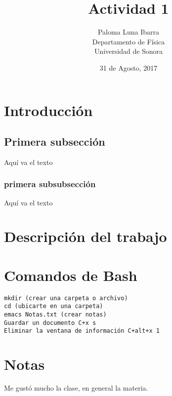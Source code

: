 \documentclass{article}
\title {Actividad 1}
\author {Paloma Luna Ibarra\\Departamento de Física\\ Universidad de Sonora}
\date {31 de Agosto, 2017}
\begin{document}
\maketitle
\section{Introducción}

\subsection{Primera subsección}
Aquí va el texto

\subsubsection{primera subsubsección}
Aquí va el texto

\section{Descripción del trabajo}

\section{Comandos de Bash}
\begin{verbatim}
mkdir (crear una carpeta o archivo)
cd (ubicarte en una carpeta)
emacs Notas.txt (crear notas)
Guardar un documento C+x s
Eliminar la ventana de información C+alt+x 1
\end{verbatim}
\section{Notas}
\begin{minipage}{2in}
Me gustó mucho la clase, en general la materia.
\end{minipage}
\end{document}
